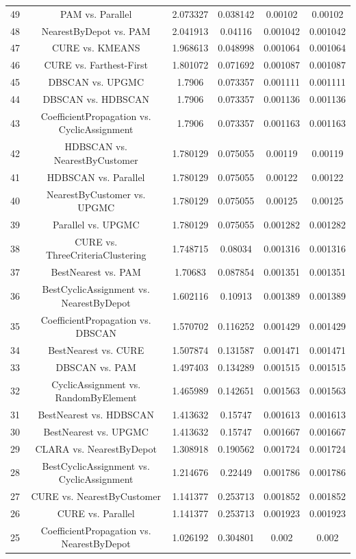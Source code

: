 \documentclass[a4paper,10pt]{article}
\begin{document}
\begin{landscape}
\begin{table}[!htp]
\begin{tabular}{cccccc}
49&PAM vs. Parallel&2.073327&0.038142&0.00102&0.00102\\
48&NearestByDepot vs. PAM&2.041913&0.04116&0.001042&0.001042\\
47&CURE vs. KMEANS&1.968613&0.048998&0.001064&0.001064\\
46&CURE vs. Farthest-First&1.801072&0.071692&0.001087&0.001087\\
45&DBSCAN vs. UPGMC&1.7906&0.073357&0.001111&0.001111\\
44&DBSCAN vs. HDBSCAN&1.7906&0.073357&0.001136&0.001136\\
43&CoefficientPropagation vs. CyclicAssignment&1.7906&0.073357&0.001163&0.001163\\
42&HDBSCAN vs. NearestByCustomer&1.780129&0.075055&0.00119&0.00119\\
41&HDBSCAN vs. Parallel&1.780129&0.075055&0.00122&0.00122\\
40&NearestByCustomer vs. UPGMC&1.780129&0.075055&0.00125&0.00125\\
39&Parallel vs. UPGMC&1.780129&0.075055&0.001282&0.001282\\
38&CURE vs. ThreeCriteriaClustering&1.748715&0.08034&0.001316&0.001316\\
37&BestNearest vs. PAM&1.70683&0.087854&0.001351&0.001351\\
36&BestCyclicAssignment vs. NearestByDepot&1.602116&0.10913&0.001389&0.001389\\
35&CoefficientPropagation vs. DBSCAN&1.570702&0.116252&0.001429&0.001429\\
34&BestNearest vs. CURE&1.507874&0.131587&0.001471&0.001471\\
33&DBSCAN vs. PAM&1.497403&0.134289&0.001515&0.001515\\
32&CyclicAssignment vs. RandomByElement&1.465989&0.142651&0.001563&0.001563\\
31&BestNearest vs. HDBSCAN&1.413632&0.15747&0.001613&0.001613\\
30&BestNearest vs. UPGMC&1.413632&0.15747&0.001667&0.001667\\
29&CLARA vs. NearestByDepot&1.308918&0.190562&0.001724&0.001724\\
28&BestCyclicAssignment vs. CyclicAssignment&1.214676&0.22449&0.001786&0.001786\\
27&CURE vs. NearestByCustomer&1.141377&0.253713&0.001852&0.001852\\
26&CURE vs. Parallel&1.141377&0.253713&0.001923&0.001923\\
25&CoefficientPropagation vs. NearestByDepot&1.026192&0.304801&0.002&0.002\\

\end{tabular}
\end{table}
\end{landscape}
\end{document}
